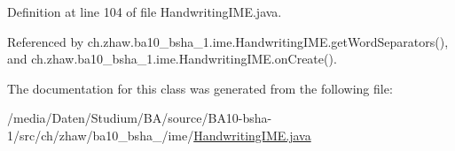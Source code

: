 Definition at line 104 of file HandwritingIME.java.

Referenced by ch.zhaw.ba10\_\-bsha\_\-1.ime.HandwritingIME.getWordSeparators(), and ch.zhaw.ba10\_\-bsha\_\-1.ime.HandwritingIME.onCreate().

The documentation for this class was generated from the following file:\begin{DoxyCompactItemize}
\item 
/media/Daten/Studium/BA/source/BA10-\/bsha-\/1/src/ch/zhaw/ba10\_\-bsha\_/ime/\hyperlink{HandwritingIME_8java}{HandwritingIME.java}\end{DoxyCompactItemize}
